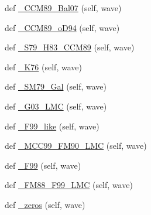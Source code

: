 \begin{DoxyCompactItemize}
\item 
def \hyperlink{classpyneb_1_1extinction_1_1red__corr_1_1_red_corr_a919503a9ebc8aafcf92ea819bcc3265c}{\+\_\+\+C\+C\+M89\+\_\+\+Bal07} (self, wave)
\item 
def \hyperlink{classpyneb_1_1extinction_1_1red__corr_1_1_red_corr_a87841a3694fd368a8583680623936e29}{\+\_\+\+C\+C\+M89\+\_\+o\+D94} (self, wave)
\item 
def \hyperlink{classpyneb_1_1extinction_1_1red__corr_1_1_red_corr_a758a99903861c8b015cc2074766ad811}{\+\_\+\+S79\+\_\+\+H83\+\_\+\+C\+C\+M89} (self, wave)
\item 
def \hyperlink{classpyneb_1_1extinction_1_1red__corr_1_1_red_corr_ac1de28238af5c2fc9924c8cda6386b2a}{\+\_\+\+K76} (self, wave)
\item 
def \hyperlink{classpyneb_1_1extinction_1_1red__corr_1_1_red_corr_a3c1ed8005a2173f7222d25df3b38e7f2}{\+\_\+\+S\+M79\+\_\+\+Gal} (self, wave)
\item 
def \hyperlink{classpyneb_1_1extinction_1_1red__corr_1_1_red_corr_acc965477d452c5914a8af1d8d6116a23}{\+\_\+\+G03\+\_\+\+L\+M\+C} (self, wave)
\item 
def \hyperlink{classpyneb_1_1extinction_1_1red__corr_1_1_red_corr_afa769aa42ed7d39fb04fd36fda88b54e}{\+\_\+\+F99\+\_\+like} (self, wave)
\item 
def \hyperlink{classpyneb_1_1extinction_1_1red__corr_1_1_red_corr_a9eacce21ff80a457fc1d285291eed996}{\+\_\+\+M\+C\+C99\+\_\+\+F\+M90\+\_\+\+L\+M\+C} (self, wave)
\item 
def \hyperlink{classpyneb_1_1extinction_1_1red__corr_1_1_red_corr_a05f6dd65005f473d38e0c1014c58fb61}{\+\_\+\+F99} (self, wave)
\item 
def \hyperlink{classpyneb_1_1extinction_1_1red__corr_1_1_red_corr_aa175c2a1489246b81d7c3b81fb88d7d9}{\+\_\+\+F\+M88\+\_\+\+F99\+\_\+\+L\+M\+C} (self, wave)
\item 
def \hyperlink{classpyneb_1_1extinction_1_1red__corr_1_1_red_corr_a2f9bf2baa246c949cc0198445e8ece10}{\+\_\+zeros} (self, wave)
\end{DoxyCompactItemize}
